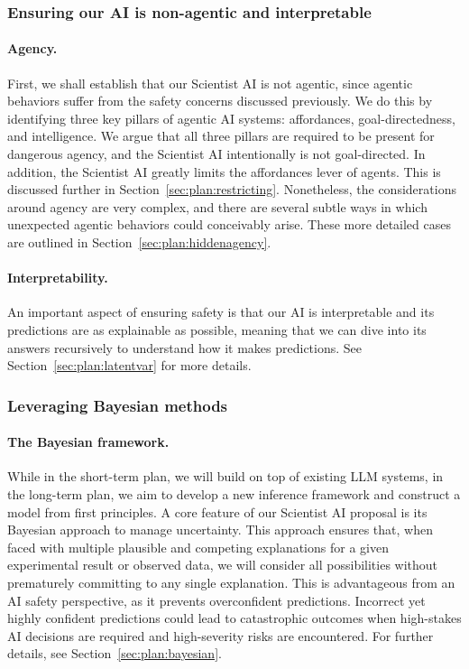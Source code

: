     \subsubsection{Ensuring our AI is non-agentic and interpretable}
    
\paragraph{Agency.} First, we shall establish that our Scientist AI is not agentic, since agentic behaviors suffer from the safety concerns discussed previously. We do this by identifying three key pillars of agentic AI systems: affordances, goal-directedness, and intelligence. We argue that all three pillars are required to be present for dangerous agency, and the Scientist AI intentionally is not goal-directed. In addition, the Scientist AI greatly limits the affordances lever of agents. This is discussed further in Section~\ref{sec:plan:restricting}. Nonetheless, the considerations around agency are very complex, and there are several subtle ways in which unexpected agentic behaviors could conceivably arise. These more detailed cases are outlined in Section~\ref{sec:plan:hiddenagency}.

\paragraph{Interpretability.} An important aspect of ensuring safety is that our AI is interpretable and its predictions are as explainable as possible, meaning that we can dive into its answers recursively to understand how it makes predictions. See Section~\ref{sec:plan:latentvar} for more details.


    \subsubsection{Leveraging Bayesian methods}

\paragraph{The Bayesian framework.} While in the short-term plan, we will build on top of existing LLM systems, in the long-term plan, we aim to develop a new inference framework and construct a model from first principles. A core feature of our Scientist AI proposal is its Bayesian approach to manage uncertainty. This approach ensures that, when faced with multiple plausible and competing explanations for a given experimental result or observed data, we will consider all possibilities without prematurely committing to any single explanation. This is advantageous from an AI safety perspective, as it prevents overconfident predictions. Incorrect yet highly confident predictions could lead to catastrophic outcomes when high-stakes AI decisions are required and high-severity risks are encountered. For further details, see Section~\ref{sec:plan:bayesian}.

